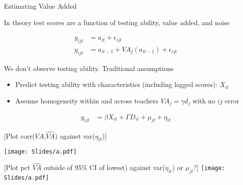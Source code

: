 \documentclass[t,aspectratio=169,11pt]{beamer}
\newenvironment{wideitemize}{\itemize\addtolength{\itemsep}{14pt}}{\enditemize}
\begin{document}
\begin{frame}{Estimating Value Added}

\begin{wideitemize}
    \item In theory test scores are a function of testing ability, value added, and noise
    
    \begin{align*}
    y_{ijt}  &= a_{it} + \epsilon_{ijt} \\
    y_{ijt}  &= a_{it-1} + VA_j(a_{it-1}) + \epsilon_{ijt}
    \end{align*}
 
    \item We don't observe testing ability. Traditional assumptions
    \begin{itemize}
        \item Predict testing ability with characteristics (including lagged scores): $X_{it}$
        \item Assume homogeneity within and across teachers $VA_j=\gamma d_j$ with no $ij$ error
    \end{itemize}
        
    \begin{align*}
    y_{ijt}  &= \beta X_{it} +\Gamma D_{it} +\mu_{jt} + \eta_{it}
    \end{align*}
    
    \item {}
       
    
\end{wideitemize}
\end{frame}

\begin{frame}{[Plot corr($VA$,$\hat{VA}$) against var($\eta_{it}$)]} %

\centering
{}
\texttt{[image: Slides/a.pdf]}

\end{frame}
\begin{frame}{[Plot pct $\hat{VA}$ outside of 95\% CI of lowest) against var($\eta_{it}$) or $\mu_{jt}$?]} 
\centering
{}
\texttt{[image: Slides/a.pdf]}

\end{frame}
\end{document}
